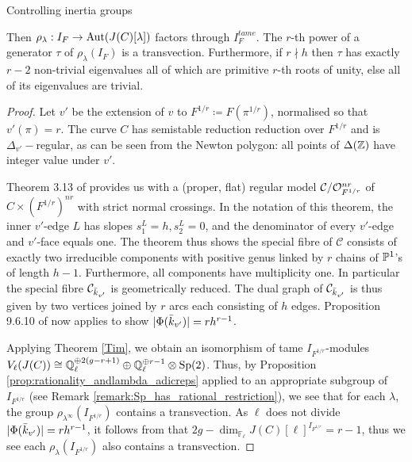 \documentclass[11pt,a4paper]{article}
\newcommand{\Fl}{\mathbb{F}_\ell}
\newcommand{\DZ}{\Delta(\ZZ)}
\begin{document}
\begin{section}{Controlling inertia groups}
\begin{proposition}
\begin{center}
\end{center}
Then $\rho_\lambda : I_F \rightarrow \Aut(J(C)[\lambda])$ factors through $I_F^{tame}$. The $r$-th power of a generator $\tau$ of $\rho_\lambda (I_F)$ is a transvection.
Furthermore, if $r \nmid h$ then $\tau$ has exactly $r-2$ non-trivial eigenvalues all of which are primitive $r$-th roots of unity, else all of its eigenvalues are trivial.
\end{proposition}

\begin{proof}
 Let $v'$ be the extension of $v$ to $F^{1/r}\coloneqq F({\pi^{1/r}})$, normalised so that $v'(\pi)= r$.
 The curve $C$ has semistable reduction reduction over $F^{1/r}$ and is $\Delta_{v'}-$regular, as can be seen from the Newton polygon: all points of $\DZ$ have integer value under $v'$.
 
 
 Theorem 3.13 of \cite{Models_Curves_DVR} provides us with a (proper, flat) regular model $\mathcal{C}/\mathcal{O}^{nr}_{F^{1/r}}$ of $C \times (F^{1/r})^{nr}$ with strict normal crossings.
In the notation of this theorem, the inner $v'$-edge $L$ has slopes $s_1^L=h, s_2^L=0$, and the denominator of every $v'$-edge and $v'$-face equals one.
The theorem thus shows the special fibre of $\mathcal{C}$ consists of exactly two irreducible components with positive genus linked by $r$ chains of $\mathbb{P}^1$'s of length $h-1$. Furthermore, all components have multiplicity one. In particular the special fibre $\mathcal{C}_{\Bar{k}_{v'}}$ is geometrically reduced.
The dual graph of $\mathcal{C}_{\Bar{k}_{v'}}$ is thus given by two vertices joined by $r$ arcs each consisting of $h$ edges. Proposition 9.6.10 of \cite{Neron_models_BLR_book} now applies to show $|\Phi(\Bar{k}_{v'})| = rh^{r-1}$.



Applying Theorem \ref{Tim}, we obtain an isomorphism of tame $I_{F^{1/r}}$-modules $V_\ell(J(C)) \cong \mathbb{Q}_\ell^{\oplus 2(g-r+1)} \oplus \mathbb{Q}_\ell^{\oplus r-1} \otimes \mathrm{Sp}(2)$.
Thus, by Proposition \ref{prop:rationality_andlambda_adicreps} applied to an appropriate subgroup of $I_{F^{1/r}}$ (see Remark \ref{remark:Sp_has_rational_restriction}), we see that for each $\lambda$, the group $\rho_{\lambda^\infty}(I_{F^{1/r}})$ contains a transvection.
As $\ell$ does not divide $|\Phi(\Bar{k}_{v'})| = rh^{r-1}$, it follows from \cite[Lemmas 1 \& 2]{Serre_Tate} that ${2g - \dim_{\Fl}J(C)[\ell]^{I_{F^{1/r}}}} = r-1$, thus we see each $\rho_{\lambda}(I_{F^{1/r}})$ also contains a transvection.



\end{proof}
\end{section}
\end{document}
